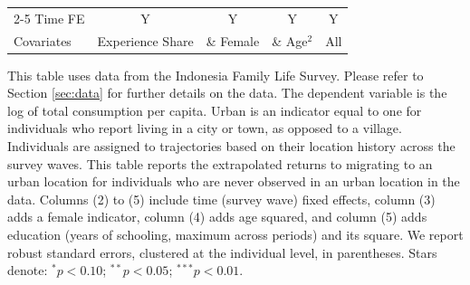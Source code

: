 \begin{table}[htbp]
\begin{threeparttable}
\begin{tabular}{l cccc}
\cmidrule{2-5} Time FE & Y & Y & Y & Y \\ Covariates & Experience Share & \& Female & \& Age$^2$ & All \\ \bottomrule \end{tabular} \begin{tablenotes}[flushleft] \footnotesize \item{This table uses data from the Indonesia Family Life Survey. Please refer to Section \ref{sec:data} for further details on the data. The dependent variable is the log of total consumption per capita. Urban is an indicator equal to one for individuals who report living in a city or town, as opposed to a village. Individuals are assigned to trajectories based on their location history across the survey waves. This table reports the extrapolated returns to migrating to an urban location for individuals who are never observed in an urban location in the data. Columns (2) to (5) include time (survey wave) fixed effects, column (3) adds a female indicator, column (4) adds age squared, and column (5) adds education (years of schooling, maximum across periods) and its square. We report robust standard errors, clustered at the individual level, in parentheses. Stars denote: $^{*} p<0.10$; $^{**} p<0.05$; $^{***} p<0.01$.} \end{tablenotes} \end{threeparttable} \end{table}
